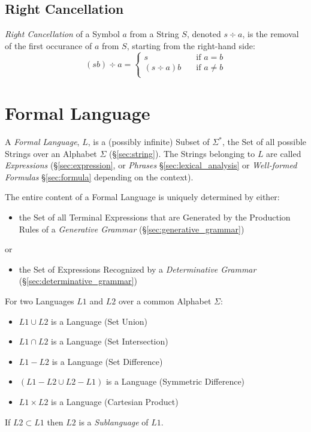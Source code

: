 \subsection{Right Cancellation}\label{sec:right_cancellation}

\emph{Right Cancellation} of a Symbol $a$ from a String $S$, denoted
$s \div a$, is the removal of the first occurance of $a$ from $S$,
starting from the right-hand side:
\[
  (sb) \div a =
  \begin{cases}
    s           & \quad \text{if $a = b$}\\
    (s \div a)b & \quad \text{if $a \neq b$}\\
  \end{cases}
\]



\section{Formal Language}\label{sec:formal_language}

A \emph{Formal Language}, $L$, is a (possibly infinite) Subset of
$\Sigma^*$, the Set of all possible Strings over an Alphabet $\Sigma$
(\S\ref{sec:string}). The Strings belonging to $L$ are called
\emph{Expressions} (\S\ref{sec:expression}, or \emph{Phrases}
\S\ref{sec:lexical_analysis} or \emph{Well-formed Formulas}
\S\ref{sec:formula} depending on the context).

The entire content of a Formal Language is uniquely determined by
either:
\begin{itemize}
  \item the Set of all Terminal Expressions that are Generated by the
    Production Rules of a \emph{Generative Grammar}
    (\S\ref{sec:generative_grammar})
\end{itemize}
or
\begin{itemize}
  \item the Set of Expressions Recognized by a \emph{Determinative
    Grammar} (\S\ref{sec:determinative_grammar})
\end{itemize}

For two Languages $L1$ and $L2$ over a common Alphabet $\Sigma$:
\begin{itemize}
  \item $L1 \cup L2$ is a Language (Set Union)
  \item $L1 \cap L2$ is a Language (Set Intersection)
  \item $L1 - L2$ is a Language (Set Difference)
  \item $(L1 - L2 \cup L2 - L1)$ is a Language (Symmetric Difference)
  \item $L1 \times L2$ is a Language (Cartesian Product)
\end{itemize}
If $L2 \subset L1$ then $L2$ is a \emph{Sublanguage} of $L1$.

